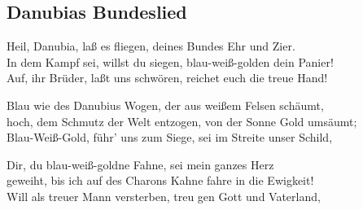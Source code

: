 
\subsection*{Danubias Bundeslied}
%
%
%
%
\nopagebreak
{}
%
\nopagebreak
\thestrophe Heil, Danubia, laß es fliegen, deines Bundes Ehr und Zier. \\
In dem Kampf sei, willst du siegen, blau-weiß-golden dein Panier! \\
Auf, ihr Brüder, laßt uns schwören, reichet euch die treue Hand! \\

\thestrophe Blau wie des Danubius Wogen, der aus weißem Felsen schäumt, \\
hoch, dem Schmutz der Welt entzogen, von der Sonne Gold umsäumt; \\
Blau-Weiß-Gold, führ' uns zum Siege, sei im Streite unser Schild, \\

\thestrophe Dir, du blau-weiß-goldne Fahne, sei mein ganzes Herz \\
geweiht, bis ich auf des Charons Kahne fahre in die Ewigkeit! \\
Will als treuer Mann versterben, treu gen Gott und Vaterland, \\
